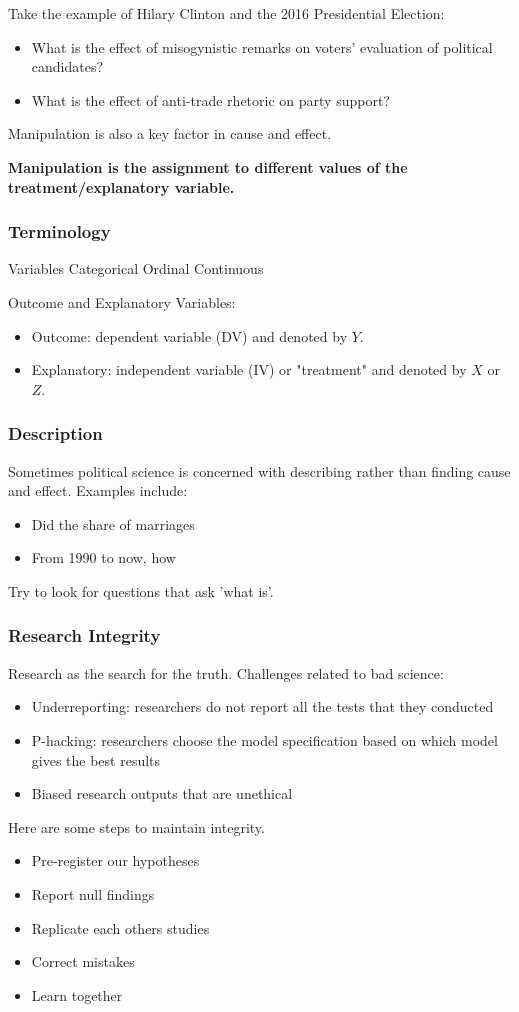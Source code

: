 \documentclass[12pt, letterpaper]{article}
\begin{document}
{Take the example of Hilary Clinton and the 2016 Presidential Election:
\begin{itemize}
	\item What is the effect of misogynistic remarks on voters' evaluation of political candidates?
	\item What is the effect of anti-trade rhetoric on party support?
\end{itemize}
Manipulation is also a key factor in cause and effect.
\begin{center}
	\textbf{Manipulation is the assignment to different values of the treatment/explanatory variable.}
\end{center}

\subsubsection{Terminology}
Variables
Categorical
Ordinal
Continuous

Outcome and Explanatory Variables:
\begin{itemize}
	\item Outcome: dependent variable (DV) and denoted by $Y$.
	\item Explanatory: independent variable (IV) or "treatment" and denoted by $X$ or $Z$.
\end{itemize}

\subsubsection{Description}
Sometimes political science is concerned with describing rather than finding cause and effect. Examples include:
\begin{itemize}
	\item Did the share of marriages 
	\item From 1990 to now, how 
\end{itemize}
Try to look for questions that ask 'what is'.

\subsubsection{Research Integrity}
Research as the search for the truth.
Challenges related to bad science:
\begin{itemize}
	\item Underreporting: researchers do not report all the tests that they conducted
	\item P-hacking: researchers choose the model specification based on which model gives the best results
	\item Biased research outputs that are unethical
\end{itemize}
Here are some steps to maintain integrity.
\begin{itemize}
	\item Pre-register our hypotheses
	\item Report null findings
	\item Replicate each others studies
	\item Correct mistakes
	\item Learn together
\end{itemize}

}
\end{document}
